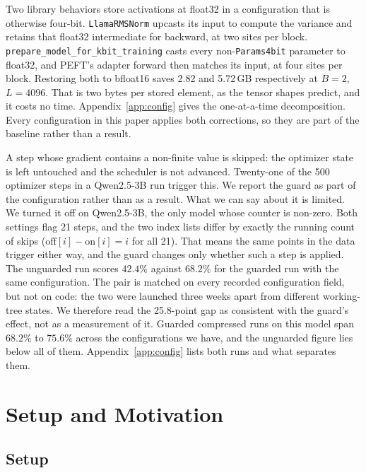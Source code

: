 \documentclass[11pt,letterpaper]{article}
\begin{document}
\medskip
\label{sec:method_dtype}
Two library behaviors store activations at float32 in a configuration that is otherwise four-bit. \texttt{LlamaRMSNorm} upcasts its input to compute the variance and retains that float32 intermediate for backward, at two sites per block. \texttt{prepare\_model\_for\_kbit\_training} casts every non-\texttt{Params4bit} parameter to float32, and PEFT's adapter forward then matches its input, at four sites per block. Restoring both to bfloat16 saves 2.82 and 5.72\,GB respectively at $B{=}2$, $L{=}4096$. That is two bytes per stored element, as the tensor shapes predict, and it costs no time. Appendix~\ref{app:config} gives the one-at-a-time decomposition. Every configuration in this paper applies both corrections, so they are part of the baseline rather than a result.

\medskip
\label{sec:method_safeguard}
A step whose gradient contains a non-finite value is skipped: the optimizer state is left untouched and the scheduler is not advanced. Twenty-one of the 500 optimizer steps in a Qwen2.5-3B run trigger this. We report the guard as part of the configuration rather than as a result. What we can say about it is limited. We turned it off on Qwen2.5-3B, the only model whose counter is non-zero. Both settings flag 21 steps, and the two index lists differ by exactly the running count of skips ($\text{off}[i] - \text{on}[i] = i$ for all 21). That means the same points in the data trigger either way, and the guard changes only whether such a step is applied. The unguarded run scores $42.4\%$ against $68.2\%$ for the guarded run with the same configuration. The pair is matched on every recorded configuration field, but not on code: the two were launched three weeks apart from different working-tree states. We therefore read the 25.8-point gap as consistent with the guard's effect, not as a measurement of it. Guarded compressed runs on this model span $68.2\%$ to $75.6\%$ across the configurations we have, and the unguarded figure lies below all of them. Appendix~\ref{app:config} lists both runs and what separates them.


\section{Setup and Motivation}
\label{sec:exp}

\subsection{Setup}
\label{sec:setup}
\end{document}
